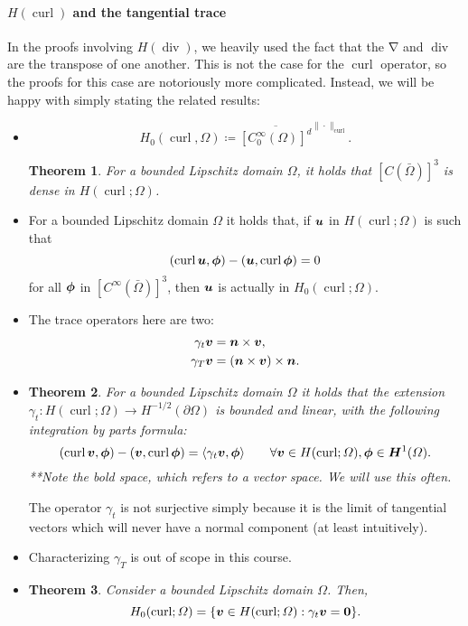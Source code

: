 \documentclass{article}
\renewcommand{\vec}{\vectorsym}
\DeclareMathOperator{\grad}{\nabla}
\DeclareMathOperator{\dive}{\text{div}}
\DeclareMathOperator{\curl}{\text{curl}}
\newtheorem{theorem}{Theorem}
\begin{document}
\paragraph{$H(\curl)$ and the tangential trace} In the proofs involving $H(\dive)$, we heavily used the fact that the $\grad$ and $\dive$ are the transpose of one another. This is not the case for the $\curl$ operator, so the proofs for this case are notoriously more complicated. Instead, we will be happy with simply stating the related results:
    \begin{itemize}
        \item $$ H_0(\curl, \Omega) \coloneqq \overline{[C_0^\infty(\Omega)]^d}^{\|\cdot\|_{\curl}}. $$
        \begin{theorem}
            For a bounded Lipschitz domain $\Omega$, it holds that $[C(\bar\Omega)]^3$ is dense in $H(\curl;\Omega)$.
        \end{theorem}
        \item For a bounded Lipschitz domain $\Omega$ it holds that, if $\vec u$ in $H(\curl;\Omega)$ is such that
            $$ (\curl \vec u, \vec \phi) - ( \vec u, \curl \vec \phi) = 0$$
        for all $\vec \phi$ in $[C^\infty(\bar\Omega)]^3$, then $\vec u$ is actually in $H_0(\curl;\Omega)$.
        \item The trace operators here are two: 
            \begin{align*}
                \gamma_t \vec v &= \vec n \times \vec v, \\
                \gamma_T \vec v &= (\vec n \times \vec v) \times \vec n. 
            \end{align*}
        \item 
        \begin{theorem}
            For a bounded Lipschitz domain $\Omega$ it holds that the extension $\gamma_t: H(\curl;\Omega) \to H^{-1/2}(\partial\Omega)$ is bounded and linear, with the following integration by parts formula: 
                $$ (\curl \vec v, \vec\phi) - (\vec v, \curl\vec \phi) = \langle \gamma_t \vec v, \vec \phi\rangle \qquad\forall \vec v \in H(\curl;\Omega), \vec\phi \in \vec H^1(\Omega). $$
            **Note the bold space, which refers to a vector space. We will use this often. 
        \end{theorem}
        The operator $\gamma_t$ is not surjective simply because it is the limit of tangential vectors which will never have a normal component (at least intuitively). 
        \item Characterizing $\gamma_T$ is out of scope in this course. 
        \item 
        \begin{theorem}
            Consider a bounded Lipschitz domain $\Omega$. Then, 
                $$ H_0(\curl;\Omega) = \{ \vec v \in H(\curl;\Omega): \gamma_t \vec v = \vec 0\}. $$
        \end{theorem}
    \end{itemize}
\end{document}
